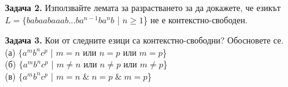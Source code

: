 \documentclass[openany]{book}
\begin{document}
\vspace{15pt}

\textbf{Задача 2.} Използвайте лемата за разрастването за да докажете, че езикът \\ 
$L = \{babaabaaab...ba^{n-1}ba^nb$ | $n \geq 1$\} не е контекстно-свободен.

\vspace{15pt}

\textbf{Задача 3.} Кои от следните езици са контекстно-свободни? Обосновете се. \\
(а) $\{a^mb^nc^p$ | $m = n$ или $n = p$ или $m = p$\} \\
(б) $\{a^mb^nc^p$ | $m \neq n$ или $n \neq p$ или $m \neq p$\} \\
(в) $\{a^mb^nc^p$ | $m = n \; \& \; n = p \; \& \; m = p$\} \\
\vspace{25pt}
\end{document}
